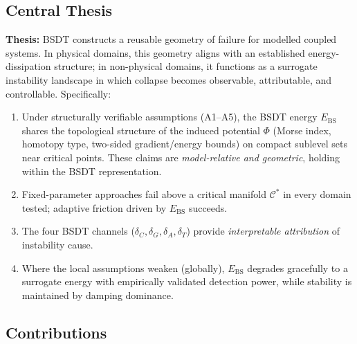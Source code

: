 \documentclass[11pt,a4paper]{article}
\newcommand{\Ebs}{E_{\mathrm{BS}}}
\newcommand{\Cman}{\mathcal{C}^*}
\begin{document}
\subsection{Central Thesis}

\textbf{Thesis:} BSDT constructs a reusable geometry of failure
for modelled coupled systems.  In physical domains, this geometry
aligns with an established energy-dissipation structure; in
non-physical domains, it functions as a surrogate instability
landscape in which collapse becomes observable, attributable, and
controllable.  Specifically:
\begin{enumerate}[nosep]
  \item Under structurally verifiable assumptions (A1--A5), the
        BSDT energy $\Ebs$ shares the topological structure of the
        induced potential $\Phi$ (Morse index, homotopy type,
        two-sided gradient/energy bounds) on compact sublevel sets
        near critical points.  These claims are \emph{model-relative
        and geometric}, holding within the BSDT representation.
  \item Fixed-parameter approaches fail above a critical manifold
        $\Cman$ in every domain tested; adaptive friction driven by
        $\Ebs$ succeeds.
  \item The four BSDT channels ($\delta_C, \delta_G, \delta_A,
        \delta_T$) provide \emph{interpretable attribution} of
        instability cause.
  \item Where the local assumptions weaken (globally), $\Ebs$
        degrades gracefully to a surrogate energy with empirically
        validated detection power, while stability is maintained by
        damping dominance.
\end{enumerate}

\subsection{Contributions}
\end{document}
